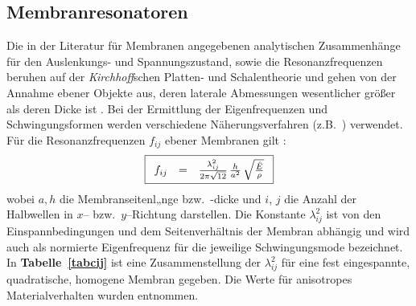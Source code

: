 \subsection{Membranresonatoren}
\label{membranreson}

Die in der Literatur für Membranen angegebenen analytischen Zusammenhänge
für den Auslenkungs- und Spannungszustand, sowie die Resonanzfrequenzen
beruhen auf der {\sl Kirchhoff}schen Platten- und Schalentheorie und gehen
von der Annahme ebener Objekte aus, deren laterale Abmessungen
wesentlicher größer als deren Dicke ist \cite{Tim87}. Bei der Ermittlung der
Eigenfrequenzen und Schwingungsformen werden verschiedene
Näherungsverfahren (z.B.\ \cite{You50}) verwendet. Für die Resonanzfrequenzen
$f_{ij}$ ebener Membranen gilt \cite{Ble84}:
%
\begin{equation}
\label{memfreq}
\fbox{$
 \displaystyle
 \begin{array}{rcl}
     f_{ij} & = & \frac{\lambda_{ij}^{2}}{2 \pi \sqrt{12}} \,
     \frac{h}{a^{2}} \, \sqrt{ \frac {\hat E}{\rho}}
 \end{array}
 $}
\end{equation}
%
wobei $a, h$ die Membranseitenl„nge bzw.\ -dicke und
$i$, $j$ die Anzahl der Halbwellen in $x$-- bzw.\ $y$--Richtung darstellen.
Die Konstante $\lambda^{2}_{ij}$ ist von den Einspannbedingungen und dem
Seitenverhältnis der Membran abhängig und wird auch als normierte
Eigenfrequenz für die jeweilige Schwingungsmode bezeichnet. In
{\bf Tabelle~\ref{tabcij}} ist eine Zusammenstellung der $\lambda_{ij}^{2}$
für eine fest eingespannte, quadratische, homogene Membran gegeben.
Die Werte für anisotropes Materialverhalten wurden \cite{Pon91} entnommen.
